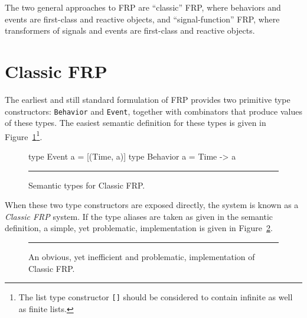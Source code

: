The two general approaches to FRP are ``classic'' FRP, where behaviors and
events are first-class and reactive objects, and ``signal-function'' FRP, where
transformers of signals and events are first-class and reactive objects.

\section{Classic FRP}
\label{section:Background-Classic_FRP}

The earliest and still standard formulation of FRP provides two primitive type
constructors: {\tt Behavior} and {\tt Event}, together with combinators that
produce values of these types. The easiest semantic definition for these types
is given in Figure~\ref{figure:classic_frp_semantic_types}\footnote{The list type constructor {\tt []} should be considered to contain infinite as well as finite lists.}.

\begin{figure}
\begin{code}
type Event a = [(Time, a)]
type Behavior a = Time -> a
\end{code}
\hrule
\caption{Semantic types for Classic FRP.}
\label{figure:classic_frp_semantic_types}
\end{figure}


When these two type constructors are exposed directly, the system is known as a 
{\em Classic FRP} system. If the type aliases are taken as given in the semantic
definition, a simple, yet problematic, implementation is given in
Figure~\ref{figure:classic_frp_simple_implementation}.

\begin{figure}
\hrule
\caption{An obvious, yet inefficient and problematic, implementation of
Classic FRP.}
\label{figure:classic_frp_simple_implementation}
\end{figure}

